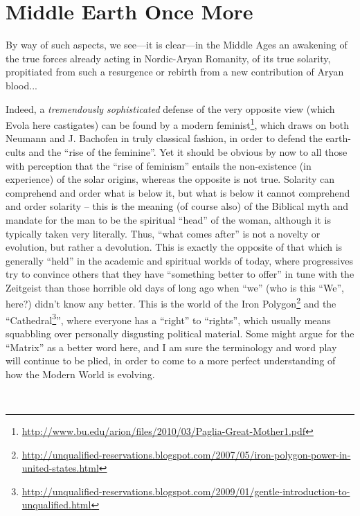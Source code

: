 \section{Middle Earth Once More}

\begin{quotex}
By way of such aspects, we see---it is clear---in the Middle Ages an awakening of the true forces already acting in Nordic-Aryan Romanity, of its true solarity, propitiated from such a resurgence or rebirth from a new contribution of Aryan blood...

\end{quotex}

Indeed, a \emph{tremendously sophisticated} defense of the very opposite view (which Evola here castigates) can be found by a modern feminist\footnote{\url{http://www.bu.edu/arion/files/2010/03/Paglia-Great-Mother1.pdf}}, which draws on both Neumann and J. Bachofen in truly classical fashion, in order to defend the earth-cults and the ``rise of the feminine''. Yet it should be obvious by now to all those with perception that the ``rise of feminism'' entails the non-existence (in experience) of the solar origins, whereas the opposite is not true. Solarity can comprehend and order what is below it, but what is below it cannot comprehend and order solarity -- this is the meaning (of course also) of the Biblical myth and mandate for the man to be the spiritual ``head'' of the woman, although it is typically taken very literally. Thus, ``what comes after'' is not a novelty or evolution, but rather a devolution. This is exactly the opposite of that which is generally ``held'' in the academic and spiritual worlds of today, where progressives try to convince others that they have ``something better to offer'' in tune with the Zeitgeist than those horrible old days of long ago when ``we'' (who is this ``We'', here?) didn't know any better. This is the world of the Iron Polygon\footnote{\url{http://unqualified-reservations.blogspot.com/2007/05/iron-polygon-power-in-united-states.html}} and the ``Cathedral\footnote{\url{http://unqualified-reservations.blogspot.com/2009/01/gentle-introduction-to-unqualified.html}}'', where everyone has a ``right'' to ``rights'', which usually means squabbling over personally disgusting political material. Some might argue for the ``Matrix'' as a better word here, and I am sure the terminology and word play will continue to be plied, in order to come to a more perfect understanding of how the Modern World is evolving.\\
{}\strut \\

